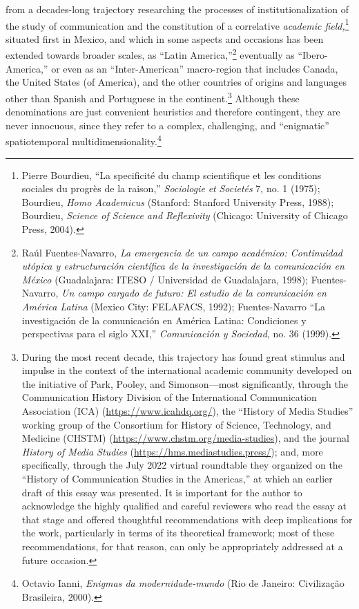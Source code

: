 \documentclass{tufte-handout}
\begin{document}
 from a decades-long trajectory researching the
processes of institutionalization of the study of communication and the
constitution of a correlative \emph{academic field,}\footnote{Pierre
  Bourdieu, ``La specificité du champ scientifique et les conditions
  sociales du progrès de la raison,'' \emph{Sociologie} \emph{et}
  \emph{Societés} 7, no. 1 (1975); Bourdieu, \emph{Homo Academicus}
  (Stanford: Stanford University Press, 1988); Bourdieu, \emph{Science
  of Science and Reflexivity} (Chicago: University of Chicago Press, 2004).} situated first in Mexico, and which in some aspects and
occasions has been extended towards broader scales, as ``Latin
America,''\footnote{Raúl Fuentes-Navarro, \emph{La emergencia de un
  campo académico: Continuidad utópica y estructuración científica de la
  investigación de la comunicación en México} (Guadalajara: ITESO /
  Universidad de Guadalajara, 1998); Fuentes-Navarro, \emph{Un campo
  cargado de futuro: El estudio de la comunicación en América Latina}
  (Mexico City: FELAFACS, 1992); Fuentes-Navarro ``La investigación de
  la comunicación en América Latina: Condiciones y perspectivas para el
  siglo XXI,'' \emph{Comunicación y Sociedad}, no. 36 (1999).}
eventually as ``Ibero-America,'' or even as an ``Inter-American''
macro-region that includes Canada, the United States (of America), and
the other countries of origins and languages other than Spanish and
Portuguese in the continent.\footnote{During the most recent decade,
  this trajectory has found great stimulus and impulse in the context of
  the international academic community developed on the initiative of
  Park, Pooley, and Simonson---most significantly, through the Communication History Division
  of the International Communication Association (ICA)
  (\url{https://www.icahdq.org/}), the ``History of Media Studies''
  working group of the Consortium for History of Science, Technology,
  and Medicine (CHSTM) (\url{https://www.chstm.org/media-studies}), and
  the journal \emph{History of Media Studies}
  (\url{https://hms.mediastudies.press/}); and, more specifically,
  through the July 2022 virtual roundtable they organized on the
  ``History of Communication Studies in the Americas,'' at which an
  earlier draft of this essay was presented. It is important for the
  author to acknowledge the highly qualified and careful reviewers who
  read the essay at that stage and offered thoughtful recommendations
  with deep implications for the work, particularly in terms of its
  theoretical framework; most of these recommendations, for that reason,
  can only be appropriately addressed at a future occasion.} Although
these denominations are just convenient heuristics and therefore
contingent, they are never innocuous, since they refer to a complex,
challenging, and ``enigmatic'' spatiotemporal
multidimensionality.\footnote{Octavio Ianni, \emph{Enigmas da
  modernidade-mundo} (Rio de Janeiro: Civilização Brasileira, 2000).}
\end{document}
